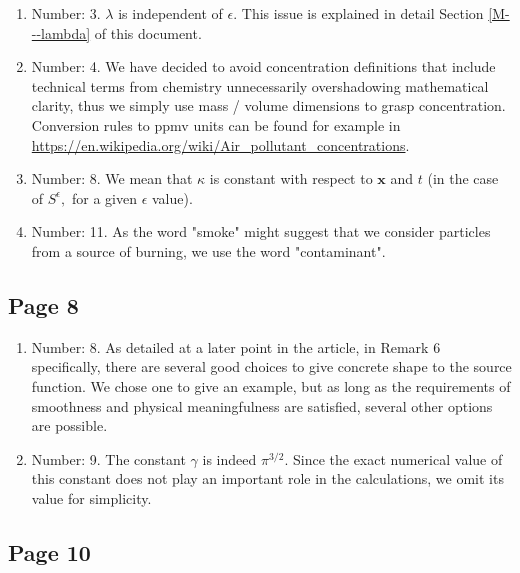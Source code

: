 \documentclass[11pt]{article}
\begin{document}
\begin{enumerate}

  \item Number: 3. $\lambda$ is independent of $\epsilon.$ This issue is explained in detail Section \ref{M---lambda} of this document.
  \item Number: 4. We have decided to avoid concentration definitions that include technical terms from chemistry unnecessarily overshadowing mathematical clarity, thus we simply use mass / volume dimensions to grasp concentration. Conversion rules to ppmv units can be found for example in \href{https://en.wikipedia.org/wiki/Air\_pollutant\_concentrations}{https://en.wikipedia.org/wiki/Air\_pollutant\_concentrations}.
  \item Number: 8. We mean that $\kappa$ is constant with respect to $\mathbf{x}$ and $t$ (in the case of $S^\epsilon,$ for a given $\epsilon$ value).
  \item Number: 11. As the word "smoke" might suggest that we consider particles from a source of burning, we use the word "contaminant".
  
\end{enumerate}

\subsection{Page 8}

\begin{enumerate}

\item Number: 8. As detailed at a later point in the article, in Remark 6 specifically, there are several good choices to give concrete shape to the source function. We chose one to give an example, but as long as the requirements of smoothness and physical meaningfulness are satisfied, several other options are possible.
\item Number: 9. The constant $\gamma$ is indeed $\pi ^ {3/2}.$ Since the exact numerical value of this constant does not play an important role in the calculations, we omit its value for simplicity.

\end{enumerate}

\subsection{Page 10}
\end{document}
